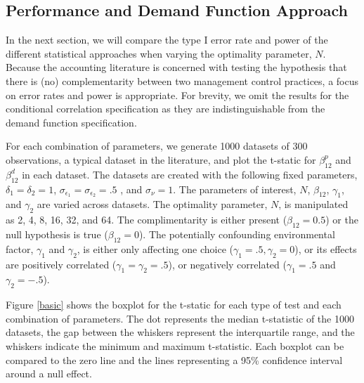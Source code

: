 \documentclass[12pt]{article}
\begin{document}
\subsection{Performance and Demand Function
Approach}\label{performance-and-demand-function-approach}

In the next section, we will compare the type I error rate and power of
the different statistical approaches when varying the optimality
parameter, \(N\). Because the accounting literature is concerned with
testing the hypothesis that there is (no) complementarity between two
management control practices, a focus on error rates and power is
appropriate. For brevity, we omit the results for the conditional
correlation specification as they are indistinguishable from the demand
function specification.

For each combination of parameters, we generate 1000 datasets of 300
observations, a typical dataset in the literature, and plot the t-static
for \(\beta^p_{12}\) and \(\beta^d_{12}\) in each dataset. The datasets
are created with the following fixed parameters,
\(\delta_1 = \delta_2 = 1\),
\(\sigma_{\epsilon_1} = \sigma_{\epsilon_2} = .5\) , and
\(\sigma_{\nu} = 1\). The parameters of interest, \(N\), \(\beta_{12}\),
\(\gamma_1\), and \(\gamma_2\) are varied across datasets. The
optimality parameter, \(N\), is manipulated as 2, 4, 8, 16, 32, and 64.
The complimentarity is either present (\(\beta_{12} = 0.5\)) or the null
hypothesis is true (\(\beta_{12} = 0\)). The potentially confounding
environmental factor, \(\gamma_1\) and \(\gamma_2\), is either only
affecting one choice (\(\gamma_1 = .5, \gamma_2 = 0\)), or its effects
are positively correlated (\(\gamma_1 = \gamma_2 = .5\)), or negatively
correlated (\(\gamma_1 = .5\) and \(\gamma_2 = -.5\)).

Figure \ref{basic} shows the boxplot for the t-static for each type of
test and each combination of parameters. The dot represents the median
t-statistic of the 1000 datasets, the gap between the whiskers represent
the interquartile range, and the whiskers indicate the minimum and
maximum t-statistic. Each boxplot can be compared to the zero line and
the lines representing a 95\% confidence interval around a null effect.
\end{document}
